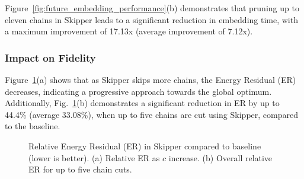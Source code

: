 Figure~\ref{fig:future_embedding_performance}(b) demonstrates that pruning up to eleven chains in Skipper leads to a significant reduction in embedding time, with a maximum improvement of 17.13x (average improvement of 7.12x).


\subsubsection{Impact on Fidelity}

Figure~\ref{fig:current_fidelity}(a) shows that as Skipper skips more chains, the Energy Residual (ER) decreases, indicating a progressive approach towards the global optimum.
Additionally, Fig.~\ref{fig:current_fidelity}(b) demonstrates a significant reduction in ER by up to 44.4\% (average 33.08\%), when up to five chains are cut using Skipper, compared to the baseline.





\begin{figure}[h]
    \captionsetup[subfigure]{position=top} %
    \centering
    \caption{  
        Relative Energy Residual (ER) in Skipper compared to baseline (lower is better). 
        (a) Relative ER as $c$ increase. 
        (b) Overall relative ER for up to five chain cuts.
    }
    \label{fig:current_fidelity} 
\end{figure}  







